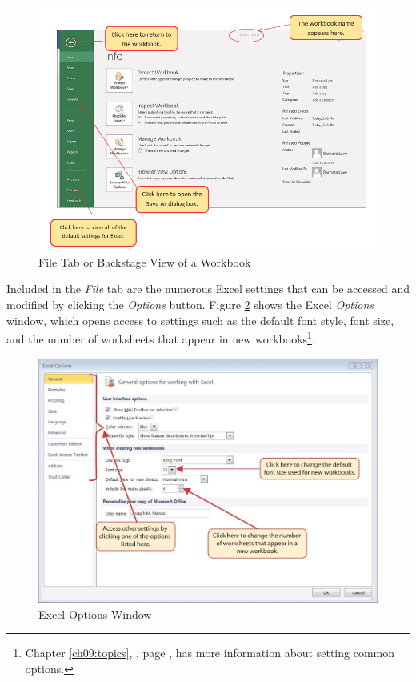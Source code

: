 \begin{figure}[H]
	\centering
	\includegraphics[width=\maxwidth{.95\linewidth}]{gfx/ch01_fig09}
	\caption{File Tab or Backstage View of a Workbook}
	\label{01:fig09}
\end{figure}

Included in the \textit{File} tab are the numerous Excel settings that can be accessed and modified by clicking the \textit{Options} button. Figure \ref{01:fig10} shows the Excel \textit{Options} window, which opens access to settings such as the default font style, font size, and the number of worksheets that appear in new workbooks\footnote{Chapter \ref{ch09:topics}, , page \pageref{ch09:topics}, has more information about setting common options.}.

\begin{figure}[H]
	\centering
	\includegraphics[width=\maxwidth{.95\linewidth}]{gfx/ch01_fig10}
	\caption{Excel Options Window}
	\label{01:fig10}
\end{figure}

